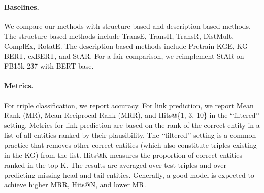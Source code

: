 \documentclass{article}
\newcommand{\wxt}[1]{{#1}}
\begin{document}
\begin{table}[h!]
    \small
    \centering
    \caption{Statistics of the datasets. \wxt{Avg DL means the average length (number of words) of descriptions.}}
    \label{tab:statistics}
\end{table}


\paragraph{\textbf{Baselines.}}  
We compare our methods with structure-based and description-based methods.
The structure-based methods include TransE, TransH, TransR, DistMult, ComplEx, RotatE. The description-based methods include Pretrain-KGE, KG-BERT, exBERT, and StAR. For a fair comparison, we reimplement StAR on FB15k-237 with BERT-base.



\paragraph{\textbf{Metrics.}}  
For triple classification, we report accuracy.
For link prediction, we report Mean Rank (MR), Mean Reciprocal Rank (MRR), and Hits@\{1, 3, 10\} in the ‘‘filtered’’ setting. 
Metrics for link prediction are based on the rank of the correct entity in a list of all entities ranked by their plausibility. 
The ‘‘filtered’’ setting is a common practice that removes other correct entities (which also constitute triples existing in the KG) from the list.
Hits@K measures the proportion of correct entities ranked in the top K.
The results are averaged over test triples and over predicting missing head and tail entities. 
Generally, a good model is expected to achieve higher MRR, Hits@N, and lower MR. 
\end{document}

